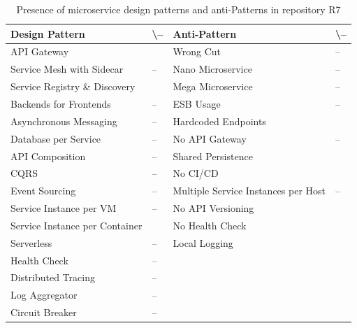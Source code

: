 \documentclass{Configuration_Files/PoliMi3i_thesis}
\newcommand{\cmark}{\ding{51}}%
\begin{document}
\begin{table}[H]
\centering 
    \begin{tabular}{ 
  | >{\centering\arraybackslash} m{16em} 
  | >{\centering\arraybackslash} m{2.2em} 
  | >{\centering\arraybackslash} m{16em} 
  | >{\centering\arraybackslash} m{2.2em} | }
    \hline
    \rowcolor{bluepoli!40}
    \textbf{Design Pattern} & \cmark \textbackslash – & \textbf{Anti-Pattern} & \cmark \textbackslash – \T\B \\
    \hline \hline
    API Gateway & \cmark & Wrong Cut & – \T\B\\
    \hline
    \rowcolor{bluepoli!10}
    Service Mesh with Sidecar & – & Nano Microservice & – \T\B \\
    \hline
    Service Registry \& Discovery & \cmark & Mega Microservice & – \T\B \\
    \hline
    \rowcolor{bluepoli!10}
    Backends for Frontends & – & ESB Usage & – \T\B \\
    \hline
    Asynchronous Messaging & – & Hardcoded Endpoints & \cmark \T\B \\
    \hline
    \rowcolor{bluepoli!10}
    Database per Service & – & No API Gateway & – \T\B \\
    \hline
    API Composition & – & Shared Persistence & \cmark \T\B \\
    \hline
    \rowcolor{bluepoli!10}
    CQRS & – & No CI/CD & \cmark \T\B \\
    \hline
    Event Sourcing & – & Multiple Service Instances per Host & – \T\B \\
    \hline
    \rowcolor{bluepoli!10}
    Service Instance per VM & – & No API Versioning & \cmark \T\B \\
    \hline
    Service Instance per Container & \cmark & No Health Check & \cmark \T\B \\
    \hline
    \rowcolor{bluepoli!10}
    Serverless & – & Local Logging & \cmark \T\B \\
    \hline
    Health Check & – &  & \T\B \\
    \hline
    \rowcolor{bluepoli!10}
    Distributed Tracing & – & & \T\B \\
    \hline
    Log Aggregator & – &  & \T\B \\
    \hline
    \rowcolor{bluepoli!10}
    Circuit Breaker & – &  & \T\B \\
    \hline
    \end{tabular}
    \\[10pt]
    \caption{Presence of microservice design patterns and anti-Patterns in repository R7}
    \label{table:R7_result}
\end{table}
\end{document}
